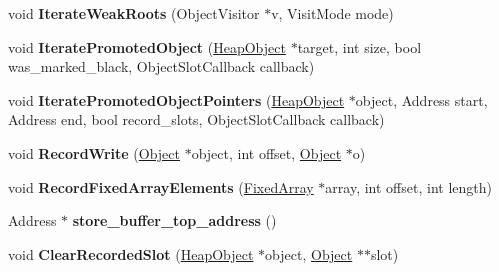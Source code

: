 \begin{DoxyCompactItemize}
\item 
void {\bfseries Iterate\+Weak\+Roots} (Object\+Visitor $\ast$v, Visit\+Mode mode)\hypertarget{classv8_1_1internal_1_1_heap_a8bc600aa3fb757754e444ce111eae01d}{}\label{classv8_1_1internal_1_1_heap_a8bc600aa3fb757754e444ce111eae01d}

\item 
void {\bfseries Iterate\+Promoted\+Object} (\hyperlink{classv8_1_1internal_1_1_heap_object}{Heap\+Object} $\ast$target, int size, bool was\+\_\+marked\+\_\+black, Object\+Slot\+Callback callback)\hypertarget{classv8_1_1internal_1_1_heap_ab21a44933490ba1f4d063f825230ed04}{}\label{classv8_1_1internal_1_1_heap_ab21a44933490ba1f4d063f825230ed04}

\item 
void {\bfseries Iterate\+Promoted\+Object\+Pointers} (\hyperlink{classv8_1_1internal_1_1_heap_object}{Heap\+Object} $\ast$object, Address start, Address end, bool record\+\_\+slots, Object\+Slot\+Callback callback)\hypertarget{classv8_1_1internal_1_1_heap_a61bba984847d7c168025646a416f16c5}{}\label{classv8_1_1internal_1_1_heap_a61bba984847d7c168025646a416f16c5}

\item 
void {\bfseries Record\+Write} (\hyperlink{classv8_1_1internal_1_1_object}{Object} $\ast$object, int offset, \hyperlink{classv8_1_1internal_1_1_object}{Object} $\ast$o)\hypertarget{classv8_1_1internal_1_1_heap_a11c09903a61044e8aadbd5352c4fd296}{}\label{classv8_1_1internal_1_1_heap_a11c09903a61044e8aadbd5352c4fd296}

\item 
void {\bfseries Record\+Fixed\+Array\+Elements} (\hyperlink{classv8_1_1internal_1_1_fixed_array}{Fixed\+Array} $\ast$array, int offset, int length)\hypertarget{classv8_1_1internal_1_1_heap_a29576b25a20fe3ef1be26dd70d3c4771}{}\label{classv8_1_1internal_1_1_heap_a29576b25a20fe3ef1be26dd70d3c4771}

\item 
Address $\ast$ {\bfseries store\+\_\+buffer\+\_\+top\+\_\+address} ()\hypertarget{classv8_1_1internal_1_1_heap_a0f3b4a2969d0d3b408ebe19f0e6226d9}{}\label{classv8_1_1internal_1_1_heap_a0f3b4a2969d0d3b408ebe19f0e6226d9}

\item 
void {\bfseries Clear\+Recorded\+Slot} (\hyperlink{classv8_1_1internal_1_1_heap_object}{Heap\+Object} $\ast$object, \hyperlink{classv8_1_1internal_1_1_object}{Object} $\ast$$\ast$slot)\hypertarget{classv8_1_1internal_1_1_heap_acc983ac9fe420a8c88542a67730c54c1}{}\label{classv8_1_1internal_1_1_heap_acc983ac9fe420a8c88542a67730c54c1}


\end{DoxyCompactItemize}
